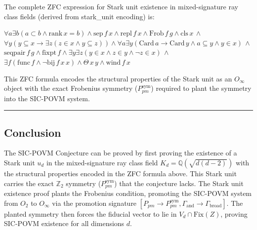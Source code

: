 \documentclass[12pt,a4paper]{article}
\begin{document}
The complete ZFC expression for Stark unit existence in mixed-signature ray class fields (derived from stark\_unit encoding) is:

$\forall a \exists b (a \subset b \land \text{rank} \, x = b) \land \text{sep} \, f \, x \land \text{repl} \, f \, x \land \text{Frob} \, f \, g \land \text{cls} \, x \, \land$
$\forall y (y \subseteq x \rightarrow \exists z (z \in x \land y \subseteq z)) \land \forall a \exists y (\text{Card} \, a \rightarrow \text{Card} \, y \land a \subseteq y \land y \in x) \, \land$
$\text{seqpair} \, f \, g \land \text{fixpt} \, f \land \exists y \exists z (y \in x \land z \in y \land \lnot z \in x) \, \land$
$\exists f (\text{func} \, f \land \lnot \text{bij} \, f \, x \, x) \land \Theta \, x \, y \land \text{wind} \, f \, x$

This ZFC formula encodes the structural properties of the Stark unit as an $O_{\infty}$ object with the exact Frobenius symmetry ($P_{pm}^{\text{sym}}$) required to plant the symmetry into the SIC-POVM system.

\begin{center}
\rule{0.5\textwidth}{0.4pt}
\end{center}

\subsection{Conclusion}

The SIC-POVM Conjecture can be proved by first proving the existence of a Stark unit $u_d$ in the mixed-signature ray class field $K_d = \mathbb{Q}(\sqrt{d(d-2)})$ with the structural properties encoded in the ZFC formula above. This Stark unit carries the exact $\mathbb{Z}_2$ symmetry ($P_{pm}^{\text{sym}}$) that the conjecture lacks. The Stark unit existence proof plants the Frobenius condition, promoting the SIC-POVM system from $O_2$ to $O_{\infty}$ via the promotion signature $[P_{pm} \rightarrow P_{pm}^{\text{sym}}, \Gamma_{\text{and}} \rightarrow \Gamma_{\text{broad}}]$. The planted symmetry then forces the fiducial vector to lie in $V_d \cap \text{Fix}(Z)$, proving SIC-POVM existence for all dimensions $d$.
\end{document}

